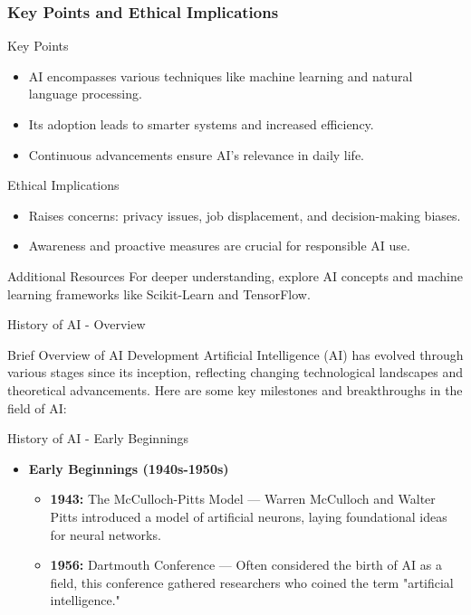 \documentclass[aspectratio=169]{beamer}
\begin{document}
\begin{frame}[fragile]
    \frametitle{Key Points and Ethical Implications}
    \begin{block}{Key Points}
        \begin{itemize}
            \item AI encompasses various techniques like machine learning and natural language processing.
            \item Its adoption leads to smarter systems and increased efficiency.
            \item Continuous advancements ensure AI's relevance in daily life.
        \end{itemize}
    \end{block}
    
    \begin{block}{Ethical Implications}
        \begin{itemize}
            \item Raises concerns: privacy issues, job displacement, and decision-making biases.
            \item Awareness and proactive measures are crucial for responsible AI use.
        \end{itemize}
    \end{block}
    
    \begin{block}{Additional Resources}
        For deeper understanding, explore AI concepts and machine learning frameworks like Scikit-Learn and TensorFlow.
    \end{block}
\end{frame}

\begin{frame}[fragile]{History of AI - Overview}
    \begin{block}{Brief Overview of AI Development}
        Artificial Intelligence (AI) has evolved through various stages since its inception, reflecting changing technological landscapes and theoretical advancements. Here are some key milestones and breakthroughs in the field of AI:
    \end{block}
\end{frame}

\begin{frame}[fragile]{History of AI - Early Beginnings}
    \begin{itemize}
        \item \textbf{Early Beginnings (1940s-1950s)}
            \begin{itemize}
                \item \textbf{1943:} The McCulloch-Pitts Model — Warren McCulloch and Walter Pitts introduced a model of artificial neurons, laying foundational ideas for neural networks.
                \item \textbf{1956:} Dartmouth Conference — Often considered the birth of AI as a field, this conference gathered researchers who coined the term "artificial intelligence."
            \end{itemize}
    \end{itemize}
\end{frame}
\end{document}
